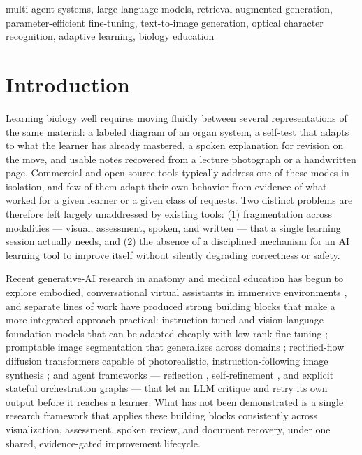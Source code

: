 \documentclass[conference]{IEEEtran}
\begin{document}
\begin{IEEEkeywords}
multi-agent systems, large language models, retrieval-augmented generation, parameter-efficient fine-tuning, text-to-image generation, optical character recognition, adaptive learning, biology education
\end{IEEEkeywords}

\section{Introduction}

Learning biology well requires moving fluidly between several representations of the same material: a labeled diagram of an organ system, a self-test that adapts to what the learner has already mastered, a spoken explanation for revision on the move, and usable notes recovered from a lecture photograph or a handwritten page. Commercial and open-source tools typically address one of these modes in isolation, and few of them adapt their own behavior from evidence of what worked for a given learner or a given class of requests. Two distinct problems are therefore left largely unaddressed by existing tools: (1) fragmentation across modalities --- visual, assessment, spoken, and written --- that a single learning session actually needs, and (2) the absence of a disciplined mechanism for an AI learning tool to improve itself without silently degrading correctness or safety.

Recent generative-AI research in anatomy and medical education has begun to explore embodied, conversational virtual assistants in immersive environments \cite{anatomyvr}, and separate lines of work have produced strong building blocks that make a more integrated approach practical: instruction-tuned and vision-language foundation models that can be adapted cheaply with low-rank fine-tuning \cite{lora,qlora}; promptable image segmentation that generalizes across domains \cite{sam2}; rectified-flow diffusion transformers capable of photorealistic, instruction-following image synthesis \cite{flux}; and agent frameworks --- reflection \cite{reflexion}, self-refinement \cite{selfrefine}, and explicit stateful orchestration graphs --- that let an LLM critique and retry its own output before it reaches a learner. What has not been demonstrated is a single research framework that applies these building blocks consistently across visualization, assessment, spoken review, and document recovery, under one shared, evidence-gated improvement lifecycle.
\end{document}
